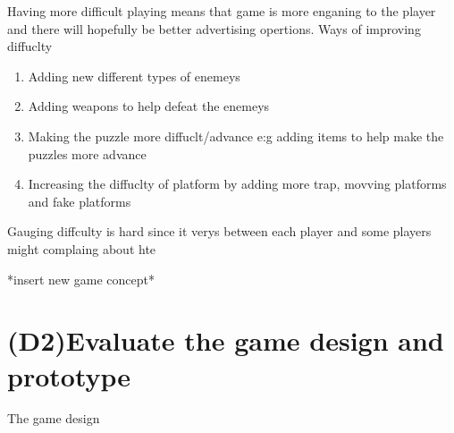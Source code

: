 \documentclass{article}
\begin{document}
Having more difficult playing means that game is more enganing to the player and there will hopefully be better advertising opertions. 
Ways of improving diffuclty
\begin{enumerate}
	\item Adding new different types of enemeys
	\item Adding weapons to help defeat the enemeys
	\item Making the puzzle more diffuclt/advance e:g adding items to help make the puzzles more advance 
	\item Increasing the diffuclty of platform by adding more trap, movving platforms and fake platforms
\end{enumerate}

Gauging diffculty is hard since it verys between each player and some players might complaing about hte 

*insert new game concept*

\section{(D2)Evaluate the game design and prototype}
The game design 
\end{document}
